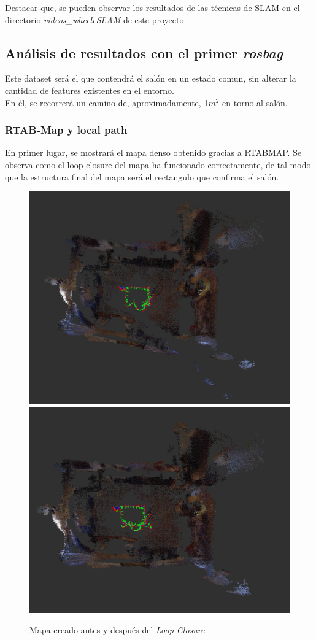 Destacar que, se pueden observar los resultados de las técnicas de SLAM en el directorio \textit{videos\_wheeleSLAM} de este proyecto.
\newpage

\subsection{Análisis de resultados con el primer \textit{rosbag}}
Este dataset será el que contendrá el salón en un estado comun, sin alterar la cantidad de features existentes en el entorno. \\
En él, se recorrerá un camino de, aproximadamente, 1$m^2$ en torno al salón.

\subsubsection{RTAB-Map y local path}
En primer lugar, se mostrará el mapa denso obtenido gracias a RTABMAP. Se observa como el loop closure del mapa ha funcionado correctamente, de tal modo que la estructura final
del mapa será el rectangulo que confirma el salón.
\begin{figure}[h!]
    \centering
    \includegraphics[width=.4\textwidth]{images/slam/bag1_rtabmap_noLC}
    \includegraphics[width=.415\textwidth]{images/slam/bag1_rtabmap_LC}
    \caption{Mapa creado antes y después del \textit{Loop Closure}}
\end{figure}

